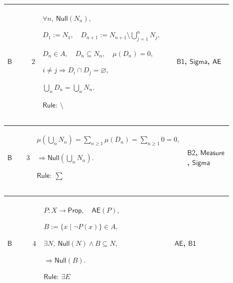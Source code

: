 \documentclass[12pt,reqno]{amsart}
\theoremstyle{blueplain}
\numberwithin{equation}{section}
\begin{document}
{\scriptsize \setlength{\parskip}{0pt}\nointerlineskip
\noindent 
\begin{tabular}{|@{}>{\centering\arraybackslash}m{0.10658\linewidth}|>{\centering\arraybackslash}m{0.03553\linewidth}|>{\centering\arraybackslash}m{0.52105\linewidth}|>{\centering\arraybackslash}m{0.23684\linewidth}|}
\hline
\hypertarget{dct:B2}{$\displaystyle \mathsf{B}$} & $\displaystyle 2$ & $%
\displaystyle \forall n,\ \mathsf{Null}(N_n),$\par$\displaystyle %
D_1:=N_1,\quad D_{n+1}:=N_{n+1}\setminus\bigcup_{j=1}^nN_j,$\par$%
\displaystyle D_n\in A,\quad D_n\subseteq N_n,\quad\mu(D_n)=0,$\par$%
\displaystyle i\ne j\Rightarrow D_i\cap D_j=\varnothing,$\par$\displaystyle %
\bigcup_nD_n=\bigcup_nN_n.$\par$\displaystyle \mathsf{Rule}:\ \setminus$ & 
\hyperlink{dct:B1}{$\displaystyle \mathsf{B1}$}, \hyperlink{ax:Sigma}{$%
\displaystyle \mathsf{Sigma}$}, \hyperlink{dctdef:AE}{$\displaystyle \mathsf{%
AE}$} \\ \hline
\end{tabular}%
}

{\scriptsize \setlength{\parskip}{0pt}\nointerlineskip
\noindent 
\begin{tabular}{|@{}>{\centering\arraybackslash}m{0.10658\linewidth}|>{\centering\arraybackslash}m{0.03553\linewidth}|>{\centering\arraybackslash}m{0.52105\linewidth}|>{\centering\arraybackslash}m{0.23684\linewidth}|}
\hline
\hypertarget{dct:B3}{$\displaystyle \mathsf{B}$} & $\displaystyle 3$ & $%
\displaystyle \mu(\bigcup_nN_n)=\sum_{n\ge1}\mu(D_n)=\sum_{n\ge1}0=0,$\par$%
\displaystyle \Rightarrow\mathsf{Null}(\bigcup_nN_n).$\par$\displaystyle 
\mathsf{Rule}:\ \sum$ & \hyperlink{dct:B2}{$\displaystyle \mathsf{B2}$}, 
\hyperlink{ax:Measure}{$\displaystyle \mathsf{Measure}$}, \hyperlink{ax:Sigma}%
{$\displaystyle \mathsf{Sigma}$} \\ \hline
\end{tabular}%
}

{\scriptsize \setlength{\parskip}{0pt}\nointerlineskip
\noindent 
\begin{tabular}{|@{}>{\centering\arraybackslash}m{0.10658\linewidth}|>{\centering\arraybackslash}m{0.03553\linewidth}|>{\centering\arraybackslash}m{0.52105\linewidth}|>{\centering\arraybackslash}m{0.23684\linewidth}|}
\hline
\hypertarget{dct:B4}{$\displaystyle \mathsf{B}$} & $\displaystyle 4$ & $%
\displaystyle P:X\to\mathsf{Prop},\quad\mathsf{AE}(P),$\par$\displaystyle %
B:=\{x\mid\neg P(x)\}\in A,$\par$\displaystyle \exists N,\ \mathsf{Null}%
(N)\land B\subseteq N,$\par$\displaystyle \Rightarrow\mathsf{Null}(B).$\par$%
\displaystyle \mathsf{Rule}:\ \exists E$ & \hyperlink{dctdef:AE}{$%
\displaystyle \mathsf{AE}$}, \hyperlink{dct:B1}{$\displaystyle \mathsf{B1}$}
\\ \hline
\end{tabular}%
}
\end{document}
